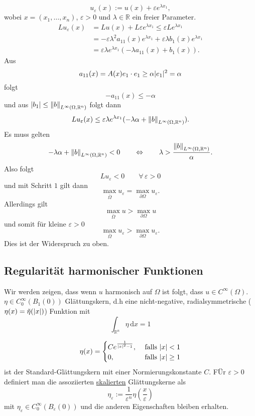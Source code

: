\begin{beweis}
\begin{description}
		\[
			u_{\varepsilon}(x):= u(x) + \varepsilon e^{\lambda x_1},
		\]
		wobei $x = (x_1, \dots, x_n)$, $\varepsilon > 0$ und $\lambda \in \mathbb{R}$ ein freier Parameter.
		\begin{align*}
			Lu_{\varepsilon}(x) &= Lu(x) + L \varepsilon e^{\lambda x_1} \leq \varepsilon L e^{\lambda x_1} \\ 
			&= - \varepsilon \lambda^2 a_{11}(x) e^{\lambda x_1} + \varepsilon \lambda b_1(x) e^{\lambda x_1} \\
			&= \varepsilon \lambda e^{\lambda x_1} ( - \lambda a_{11}(x)+ b_1(x)).
		\end{align*}
		Aus \begin{equation}
			a_{11}(x)= A(x)e_1 \cdot e_1 \geq \alpha \lvert e_1\rvert^2 = \alpha
		\end{equation}
		folgt
		\[
			-a_{11}(x) \leq -\alpha
		\]
		und aus $\abs{b_1} \leq \norm{b}_{L^{\infty}(\Omega,\mathbb{R}^n)}$ folgt dann
		\[
			Lu_{\varepsilon}(x) \leq  \varepsilon \lambda e^{\lambda x_1}(-\lambda \alpha + \norm{b}_{L^{\infty}(\Omega,\mathbb{R}^n)}).
		\]
		Es muss gelten 
		\[
			-\lambda \alpha + \norm{b}_{L^{\infty}(\Omega,\mathbb{R}^n)}<0 \qquad \Leftrightarrow \qquad \lambda > \frac{\norm{b}_{L^{\infty}(\Omega,\mathbb{R}^n)}}{\alpha}.
		\]
		Also folgt 
		\[
			Lu_{\varepsilon} < 0 \qquad \forall\, \varepsilon >0 
		\]
		und mit Schritt $1$ gilt dann
		\[
			\max_{\bar{\Omega}}u_{\varepsilon} = \max_{ \partial \Omega}u_{\varepsilon}.
		\]
		Allerdings gilt \[
			\max_{\bar{\Omega}}u > \max_{ \partial \Omega}u
		\]
		und somit für kleine $\varepsilon >0$ \[
			\max_{\bar{\Omega}}u_{\varepsilon} > \max_{ \partial \Omega}u_{\varepsilon}.
		\]
		Dies ist der Widerspruch zu oben.
 	\end{description}
\end{beweis}
\subsection{Regularität harmonischer Funktionen} 
\label{sub:regularitat_harmonischer_funktionen}
Wir werden zeigen, dass wenn $u$ harmonisch auf $\Omega$ ist folgt, dass $u \in C^{\infty}(\Omega)$.
$\eta \in C^{\infty}_0(B_1(0))$ Glättungskern, d.h eine nicht-negative, radialsymmetrische ($\eta(x)=\tilde\eta(\lvert x\rvert)$) Funktion mit
\[
	\int_{\mathbb{R}^n}^{}\eta \,\mathrm{d}x = 1
\]	
\begin{beispiel}
	\begin{equation}
		\eta(x) = \begin{cases}
			C e^{\frac{1}{\lvert x\rvert^2-1}}, &\text{ falls }\lvert x\rvert<1\\
			0 , &\text{ falls }\lvert x\rvert\geq 1\\
		\end{cases}
	\end{equation}
	ist der Standard-Glättungskern mit einer Normierungskonstante $C$. FÜr $\varepsilon > 0$ definiert man die assoziierten \underline{skalierten} Glättungskerne als
	\[
		\eta_{\varepsilon}:= \frac{1}{\varepsilon^n}\eta \left( \frac{x}{\varepsilon} \right)
	\]
	mit $\eta_{\varepsilon} \in C_0^{\infty}(B_{\varepsilon}(0))$ und die anderen Eigenschaften bleiben erhalten.
\end{beispiel}
